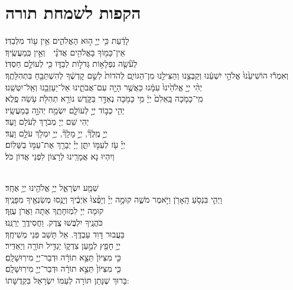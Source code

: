 \documentclass[twoside, openany, parskip=half, 11pt]{book}
\begin{document}
\chapter[הקפות לשמחת תורה]{ הקפות לשמחת תורה }

 לָדַ֔עַת כִּ֥י יְיָ֖ ה֣וּא הָאֱלֹהִ֑ים אֵ֥ין ע֖וֹד מִלְּבַדּֽוֹ׃\\
אֵין־כָּמ֖וֹךָ
 בָאֱלֹהִ֥ים אֲדֹנָ֗י וְאֵ֣ין כְּֽמַעֲשֶֽׂיךָ׃\\
לְעֹ֘שֵׂ֤ה 
נִפְלָא֣וֹת גְּדֹל֣וֹת לְבַדּ֑וֹ כִּ֖י לְעוֹלָ֣ם חַסְדּֽוֹ׃\\
וְאִמְר֕וּ
 הוֹשִׁיעֵ֙נוּ֙ אֱלֹהֵ֣י יִשְׁעֵ֔נוּ וְקַבְּצֵ֥נוּ וְהַצִּילֵ֖נוּ מִן־הַגּוֹיִ֑ם לְהֹדוֹת֙ לְשֵׁ֣ם קׇדְשֶׁ֔ךָ לְהִשְׁתַּבֵּ֖חַ בִּתְהִלָּתֶֽךָ׃\\
יְהִ֨י
 יְיָ֤ אֱלֹהֵ֙ינוּ֙ עִמָּ֔נוּ כַּאֲשֶׁ֥ר הָיָ֖ה עִם־אֲבֹתֵ֑ינוּ אַל־יַעַזְבֵ֖נוּ וְאַֽל־יִטְּשֵֽׁנוּ׃\\
מִֽי־כָמֹ֤כָה
 בָּֽאֵלִם֙ יְיָ֔ מִ֥י כָּמֹ֖כָה נֶאְדָּ֣ר בַּקֹּ֑דֶשׁ נוֹרָ֥א תְהִלֹּ֖ת עֹ֥שֵׂה פֶֽלֶא׃\\
יְהִ֤י
 כְב֣וֹד יְיָ֣ לְעוֹלָ֑ם יִשְׂמַ֖ח יְהֹוָ֣ה בְּמַעֲשָֽׂיו׃\\
יְהִי
 שֵׁם יְיָ מְבֹרָךְ לְעֹלָם וָעֶד׃\\
יְיָ֣ מֶֽלֶךְ֘,
 יְיָ֣ מָלָךְ֘, יְיָ֥ יִמְלֹ֖ךְ עֹלָ֥ם וָעֶֽד׃\\
יְיָ֗ עֹ֖ז
 לְעַמּ֣וֹ יִתֵּ֑ן יְיָ֓ יְבָרֵ֖ךְ אֶת־עַמּ֣וֹ בַשָּׁלֽוֹם׃\\
וְיִהְיוּ נָא אֲמָרֵֽינוּ לְרָצוֹן לִפְנֵי אֲדוֹן כֹּל׃

\\
שְׁמַ֖ע
 יִשְׂרָאֵ֑ל יְיָ֥ אֱלֹהֵ֖ינוּ יְיָ֥ אֶחָֽד׃\\
וַיְהִ֛י
 בִּנְסֹ֥עַ הָֽאָרֹ֖ן וַיֹּ֣אמֶר מֹשֶׁ֑ה קוּמָ֣ה יְיָ֗ וְיָפֻ֨צוּ֙ אֹֽיְבֶ֔יךָ וְיָנֻ֥סוּ מְשַׂנְאֶ֖יךָ מִפָּנֶֽיךָ׃\\
קוּמָה
 יְיָ לִמְוּחָתֶֽךָ אַתָה וַאֲרֹן עֻזֶּֽךָ׃\\
 כֹּהֲנֶֽיךָ יִלְבֲּשׁוּ צֶֽדֶק. וַחֲסִידֶֽךַ יְרַנֵּֽנוּ׃\\
  בַּעֲבוּר דָּוִד עַבְדֶּֽךָ. אַל תָּשֵׁב פּֽנֵי מְשִׁיחֶֽךָ׃\\
יְיָ֥
 חָפֵ֖ץ לְמַ֣עַן צִדְק֑וֹ יַגְדִּ֥יל תּוֹרָ֖ה וְיַאְדִּֽיר׃\\
  כִּ֤י מִצִּיּוֹן֙ תֵּצֵ֣א תוֹרָ֔ה וּדְבַר־יְיָ֖ מִירֽוּשָׁלָֽםִ׃\\
כִּ֤י
 מִצִּיּוֹן֙ תֵּצֵ֣א תוֹרָ֔ה וּדְבַר־יְיָ֖ מִירֽוּשָׁלָֽםִ׃\\
  בָּרוּךְ שֶׁנָּתַן תּוֹרָה לְעַמּוֹ יִשְׂרָאֵל בִּקְדֻשָּׁתוֹ:
\end{document}

